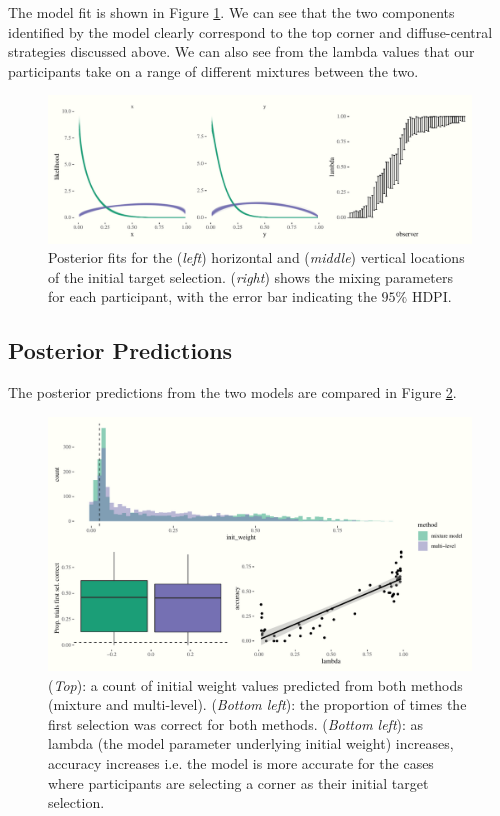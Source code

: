 \documentclass[vision,article,submit,pdftex,moreauthors]{Definitions/mdpi}
\begin{document}
The model fit is shown in Figure \ref{fig:qjep_init2_sel_mdl}. We can see that the two components identified by the model clearly correspond to the top corner and diffuse-central strategies discussed above. We can also see from the lambda values that our participants take on a range of different mixtures between the two. 

\begin{figure}[H]
\centering
\includegraphics[width=\textwidth]{Figures/init_sel2_mdl.pdf}
\caption{Posterior fits for the (\textit{left}) horizontal and (\textit{middle}) vertical locations of the initial target selection. (\textit{right}) shows the mixing parameters for each participant, with the error bar indicating the $95\%$ HDPI.}
\label{fig:qjep_init2_sel_mdl}
\end{figure} 


\subsection{Posterior Predictions}

The posterior predictions from the two models are compared in Figure \ref{fig:qjep_init_sel_pred}.

\begin{figure}[H]
\centering
\includegraphics[width=12 cm]{Figures/qjep_init_sel_preds.pdf}
\caption{(\textit{Top}): a count of initial weight values predicted from both methods (mixture and multi-level). (\textit{Bottom left}): the proportion of times the first selection was correct for both methods.  (\textit{Bottom left}): as lambda (the model parameter underlying initial weight) increases, accuracy increases i.e. the model is more accurate for the cases where participants are selecting a corner as their initial target selection.} 
\label{fig:qjep_init_sel_pred}
\end{figure} 
\end{document}
